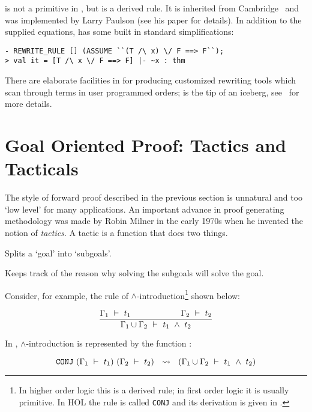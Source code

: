      is not a primitive in \HOL, but is a derived
    rule. It is inherited from Cambridge \LCF\ and was implemented by
    Larry Paulson (see his paper \cite{lcp-rewrite} for details). In
    addition to the supplied equations,  has some
    built in standard simplifications:

\begin{session}\begin{verbatim}
- REWRITE_RULE [] (ASSUME ``(T /\ x) \/ F ==> F``);
> val it = [T /\ x \/ F ==> F] |- ~x : thm
\end{verbatim}\end{session}

    There are elaborate facilities in \HOL{} for producing customized
    rewriting tools which scan through terms in user programmed
    orders;  is the tip of an iceberg, see
    \DESCRIPTION\ for more details.

\section{Goal Oriented Proof: Tactics and Tacticals}
\label{backward}\label{tactics}

The style of forward proof described in the previous section is
unnatural and too `low level' for many applications. An important
advance in proof generating methodology was made by Robin Milner in
the early 1970s when he invented the notion of {\it tactics\/}. A
tactic is a function that does two things.
\begin{myenumerate}
\item Splits a `goal' into `subgoals'.
\item Keeps track of the reason why solving the subgoals will solve the goal.
\end{myenumerate}

\noindent Consider, for example, the  rule of $\wedge$-introduction\footnote{In
  higher order logic this is a derived rule; in first order logic it
  is usually primitive.  In HOL the rule is called {\tt CONJ} and its
  derivation is given in \DESCRIPTION.}  shown below:

\[ \frac{\Gamma_1\ \vdash\ 
t_1\qquad\qquad\qquad\Gamma_2\ \vdash\  t_2}{\Gamma_1\cup\Gamma_2 \ \vdash\  t_1\ \wedge\ 
t_2} \]


\noindent In \HOL,  $\wedge$-introduction is  represented by  the \ML{} function
:

\[\ml{CONJ}\ (\Gamma_1\turn t_1)\ (\Gamma_2\turn t_2) \ \ \leadsto\
\ (\Gamma_1\cup\Gamma_2\turn  t_1\conj  t_2)\]

